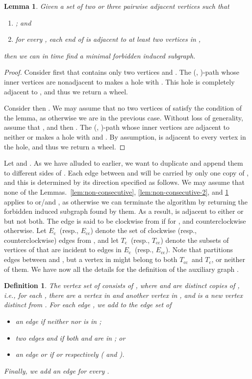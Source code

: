 \documentclass[10pt]{article}
\newtheorem{lemma}[theorem]{Lemma}
\newtheorem{definition}{Definition}
\newcommand{\badgraph}{minimal forbidden induced subgraph}
\newcommand{\head}[1]{\ensuremath{{\mathtt{last}(#1)}}}
\newcommand{\tail}[1]{\ensuremath{{\mathtt{first}(#1)}}}
\newcommand{\stpath}[2]{(, )-path}
\newcommand{\ec}{\ensuremath{E_{\text{c}}}}
\newcommand{\ecc}{\ensuremath{E_{\text{cc}}}}
\newcommand{\oc}{\ensuremath{T_{\text{c}}}}
\newcommand{\occ}{\ensuremath{T_{\text{cc}}}}
\begin{document}
\begin{lemma}\label{lem:non-helly}
  Given a set  of two or three pairwise adjacent vertices such that
  \begin{enumerate}[1)]
  \item ; and 
  \item for every , each end of  is adjacent to at
    least two vertices in ,
  \end{enumerate}
  then we can in  time find a \badgraph.
\end{lemma}
\begin{proof}
  Consider first that  contains only two vertices  and .
  The \stpath{h_{\tail{v_1}}}{h_{\head{v_1}}} whose inner vertices are
  nonadjacent to  makes a hole with .  This hole is
  completely adjacent to , and thus we return a wheel.

  Consider then .  We may assume that no two
  vertices of  satisfy the condition of the lemma, as otherwise we
  are in the previous case.  Without loss of generality, assume that
  , and then .
  The \stpath{h_{\tail{v_1}}}{h_{\head{v_2}}} whose inner vertices are
  adjacent to neither  or  makes a hole with  and
  .  By assumption,  is adjacent to every vertex in the
  hole, and thus we return a wheel.
\end{proof}

Let  and .  As we
have alluded to earlier, we want to duplicate  and append them to
different sides of .  Each edge between  and
 will be carried by only one copy of , and
this is determined by its direction specified as follows.  We may
assume that none of the Lemmas.~\ref{lem:non-consecutive},
\ref{lem:non-consecutive-2}, and \ref{lem:non-helly} applies to 
or/and , as otherwise we can terminate the algorithm by returning
the forbidden induced subgraph found by them.  As a result,  is
adjacent to either  or  but not both.  The edge  is said to be clockwise
from  if  for , and
counterclockwise otherwise.  Let \ec\ (resp., \ecc) denote the set of
clockwise (resp., counterclockwise) edges from , and let \oc\
(resp., \occ) denote the subsets of vertices of  that are
incident to edges in \ec\ (resp., \ecc).  Note that 
partitions edges between  and , but a vertex in
 might belong to both \occ\ and \oc, or neither of them.  We have
now all the details for the definition of the auxiliary graph
.

\begin{definition}
  The vertex set of  consists of , where  and  are distinct copies of , i.e.,
  for each , there are a vertex  in  and another
  vertex  in , and  is a new vertex distinct from .
  For each edge , we add to the edge set of 
  \begin{itemize}
  \item an edge  if neither  nor  is in ;
  \item two edges  and  if both  and  are in
    ; or
  \item an edge  or  if  or 
    respectively ( and ).
  \end{itemize}
  Finally, we add an edge  for every .
\end{definition} 
\end{document}

